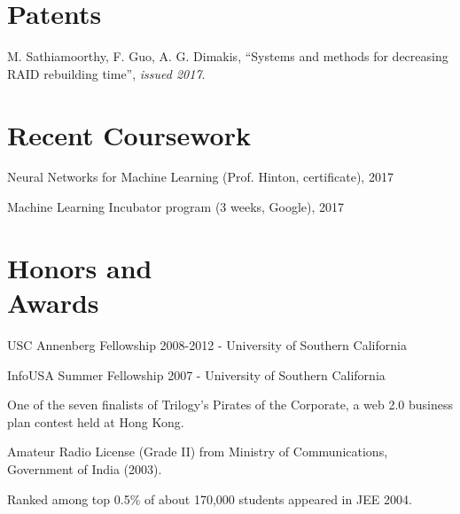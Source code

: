 \documentclass[margin,line]{resume}
\begin{document}
\begin{resume}
\section{\mysidestyle Patents}
\begin{list2}
  \item M. Sathiamoorthy, F. Guo, A. G. Dimakis, ``Systems and methods for decreasing RAID rebuilding time'', \textsl{issued 2017}.
\end{list2}

\section{\mysidestyle Recent Coursework} 
\begin{list2}
\item Neural Networks for Machine Learning (Prof. Hinton, certificate), 2017
\item Machine Learning Incubator program (3 weeks, Google), 2017
\end{list2}



    
\section{\mysidestyle Honors and\\Awards} 
\begin{list2}
	  \item USC Annenberg Fellowship 2008-2012	- University of Southern California
          \item InfoUSA Summer Fellowship 2007	- University of Southern California %
	  \item One of the seven finalists of Trilogy's Pirates of the Corporate, a web 2.0 business plan contest held at Hong Kong. %
	  \item Amateur Radio License (Grade II) from Ministry of Communications, Government of India (2003).%
	  \item Ranked among top 0.5\% of about 170,000 students appeared in JEE 2004. \\%
\end{list2}
  
\end{resume}
\end{document}

